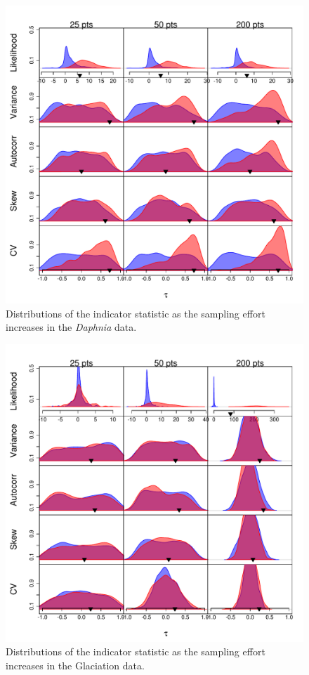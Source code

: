 \documentclass[11pt]{elsarticle}
\begin{document}
\begin{figure}[ht]
  \begin{center}
    \includegraphics{FigS4.pdf}
  \end{center}
  \caption{Distributions of the indicator statistic as the sampling effort increases in the \emph{Daphnia} data.}
  \label{fig:S4}
\end{figure}


\begin{figure}[ht]
  \begin{center}
    \includegraphics{FigS5.pdf}
  \end{center}
  \caption{Distributions of the indicator statistic as the sampling effort increases in the Glaciation data.}
  \label{fig:S5}
\end{figure}
\end{document}
